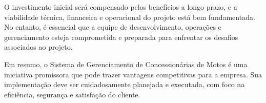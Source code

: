        O investimento inicial será compensado pelos benefícios a longo prazo, e a viabilidade técnica, financeira e operacional do projeto está bem fundamentada. No entanto, é essencial que a equipe de desenvolvimento, operações e gerenciamento esteja comprometida e preparada para enfrentar os desafios associados ao projeto.
       
       Em resumo, o Sistema de Gerenciamento de Concessionárias de Motos é uma iniciativa promissora que pode trazer vantagens competitivas para a empresa. Sua implementação deve ser cuidadosamente planejada e executada, com foco na eficiência, segurança e satisfação do cliente.
